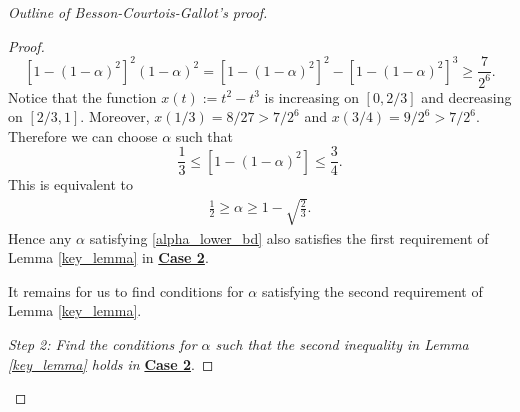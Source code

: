 \documentclass{article}
\theoremstyle{definition}
\begin{document}
\begin{proof}[Outline of Besson-Courtois-Gallot's proof]
\begin{proof}
$$[1-(1-\alpha)^2]^2(1-\alpha)^2=[1-(1-\alpha)^2]^2-[1-(1-\alpha)^2]^3\geq\frac{7}{2^6}.$$
Notice that the function $x(t):=t^2-t^3$ is increasing on $[0,2/3]$ and decreasing on $[2/3,1]$. Moreover, $x(1/3)=8/27>7/2^6$ and $x(3/4)=9/2^6>7/2^6$. Therefore we can choose $\alpha$ such that
$$\frac{1}{3}\leq [1-(1-\alpha)^2]\leq\frac{3}{4}.$$
This is equivalent to
\begin{align}
\label{alpha_lower_bd}\frac{1}{2}\geq\alpha\geq 1-\sqrt{\frac{2}{3}}.
\end{align}
Hence any $\alpha$ satisfying \eqref{alpha_lower_bd} also satisfies the first requirement of Lemma \ref{key_lemma} in \textbf{\hyperlink{case2}{Case 2}}.

It remains for us to find conditions for $\alpha$ satisfying the second requirement of Lemma \ref{key_lemma}.

\textit{Step 2: Find the conditions for $\alpha$ such that the second inequality in Lemma \ref{key_lemma} holds in} \textbf{\hyperlink{case2}{Case 2}}. 


\end{proof}
\end{proof}
\end{document}
